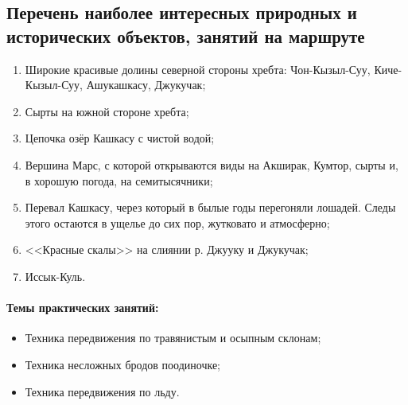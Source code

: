\subsection{Перечень наиболее интересных природных и исторических объектов, занятий на маршруте}
\begin{enumerate}[noitemsep,topsep=0pt,parsep=0pt,partopsep=0pt]
	\item Широкие красивые долины северной стороны хребта: Чон-Кызыл-Суу, Киче-Кызыл-Суу, Ашукашкасу, Джукучак; 
	\item Сырты на южной стороне хребта; 
	\item Цепочка озёр Кашкасу с чистой водой; 
	\item Вершина Марс, с которой открываются виды на Акширак, Кумтор, сырты и, в хорошую погода, на семитысячники; 
	\item Перевал Кашкасу, через который в былые годы перегоняли лошадей. Следы этого остаются в ущелье до сих пор, жутковато и атмосферно; 
	\item <<Красные скалы>> на слиянии р. Джууку и Джукучак;
	\item Иссык-Куль.
\end{enumerate}

\paragraph{Темы практических занятий:}

\begin{itemize}
	\item Техника передвижения по травянистым и осыпным склонам;
	\item Техника несложных бродов поодиночке;
	\item Техника передвижения по льду.
\end{itemize}

\newpage
